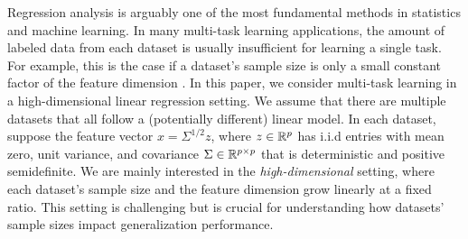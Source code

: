 
Regression analysis is arguably one of the most fundamental methods in statistics and machine learning.
In many multi-task learning applications, the amount of labeled data from each dataset is usually insufficient for learning a single task.
For example, this is the case if a dataset's sample size is only a small constant factor of the feature dimension \cite{GLUE}.
In this paper, we consider multi-task learning in a high-dimensional linear regression setting.
We assume that there are multiple datasets that all follow a (potentially different) linear model.
In each dataset, suppose the feature vector $x = {\Sigma}^{1/2} z$, where $z \in \mathbb{R}^p$ has i.i.d entries with mean zero, unit variance, and covariance $\Sigma \in\mathbb{R}^{p \times p}$ that is deterministic and positive semidefinite.
We are mainly interested in the \textit{high-dimensional} setting, where each dataset's sample size and the feature dimension grow linearly at a fixed ratio.
This setting is challenging but is crucial for understanding how datasets' sample sizes impact generalization performance.

